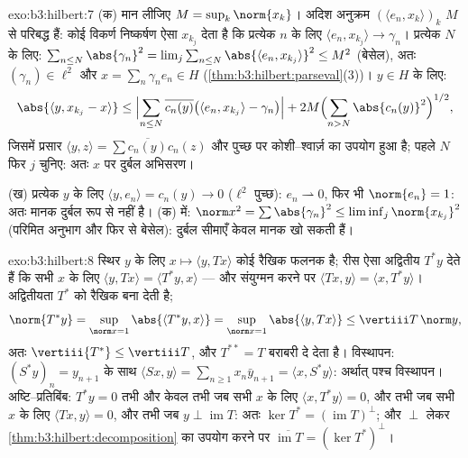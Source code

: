 \begin{solution}{exo:b3:hilbert:7}
(क) मान लीजिए $M = \sup_k\norm{x_k}$। अदिश अनुक्रम $(\langle e_n, x_k\rangle)_k$ $M$ से परिबद्ध हैं: कोई
विकर्ण निष्कर्षण ऐसा $x_{k_j}$ देता है कि प्रत्येक $n$ के लिए $\langle e_n, x_{k_j}\rangle
\to \gamma_n$।
प्रत्येक $N$ के लिए: $\sum_{n\leq
N}\abs{\gamma_n}^2 = \lim_j\sum_{n\leq N}\abs{\langle e_n,
x_{k_j}\rangle}^2 \leq M^2$ (बेसेल), अतः $(\gamma_n) \in
\ell^2$ और $x = \sum_n\gamma_ne_n \in H$ (\cref{thm:b3:hilbert:parseval}(3))।
$y \in H$ के लिए:
\[
\abs{\langle y, x_{k_j} - x\rangle}
\leq \Bigl|\sum_{n\leq N}\overline{c_n(y)}\bigl(\langle e_n,
x_{k_j}\rangle - \gamma_n\bigr)\Bigr|
+ 2M\Bigl(\sum_{n>N}\abs{c_n(y)}^2\Bigr)^{1/2},
\]
जिसमें प्रसार $\langle y, z\rangle =
\sum\overline{c_n(y)}c_n(z)$ और पुच्छ पर कोशी--श्वार्ज़ का उपयोग हुआ है; पहले
$N$ फिर $j$ चुनिए: अतः $x$ पर दुर्बल अभिसरण।

(ख) प्रत्येक $y$ के लिए $\langle y, e_n\rangle = c_n(y) \to 0$ ($\ell^2$ पुच्छ): $e_n \rightharpoonup 0$, फिर भी $\norm{e_n} =
1$:
अतः मानक दुर्बल रूप से  नहीं है। (क) में: $\norm x^2 =
\sum\abs{\gamma_n}^2 \leq \liminf_j\norm{x_{k_j}}^2$ (परिमित अनुभाग
और फिर से बेसेल): दुर्बल सीमाएँ केवल मानक खो सकती हैं।
\end{solution}

\begin{solution}{exo:b3:hilbert:8}
स्थिर $y$ के लिए $x \mapsto \langle y, Tx\rangle$ कोई  रैखिक फलनक है; रीस ऐसा अद्वितीय
$T^*y$ देते हैं कि सभी $x$ के लिए $\langle y, Tx\rangle = \langle T^*y, x\rangle$ --- और संयुग्मन करने पर
$\langle Tx, y\rangle = \langle x,
T^*y\rangle$। अद्वितीयता $T^*$ को रैखिक बना देती है;
\[
\norm{T^*y} = \sup_{\norm x = 1}\abs{\langle T^*y, x\rangle}
= \sup_{\norm x=1}\abs{\langle y, Tx\rangle}
\leq \vertiii T\,\norm y,
\]
अतः $\vertiii{T^*} \leq \vertiii T$, और $T^{**} = T$ बराबरी दे देता है। विस्थापन: $(S^*y)_n =
y_{n+1}$ के साथ $\langle Sx, y\rangle = \sum_{n\geq1}
x_n\bar y_{n+1} = \langle x, S^*y\rangle$:
अर्थात् पश्च विस्थापन। अष्टि--प्रतिबिंब: $T^*y = 0$ तभी और केवल तभी जब
सभी $x$ के लिए $\langle x, T^*y\rangle = 0$, और तभी जब सभी $x$ के लिए $\langle Tx,
y\rangle = 0$, और तभी जब
$y \perp \operatorname{im}T$: अतः $\ker T^* = (\operatorname{im}T)^\perp$; और $\perp$ लेकर \cref{thm:b3:hilbert:decomposition} का उपयोग करने पर $\overline{\operatorname{im}T} = (\ker T^*)^\perp$।
\end{solution}

